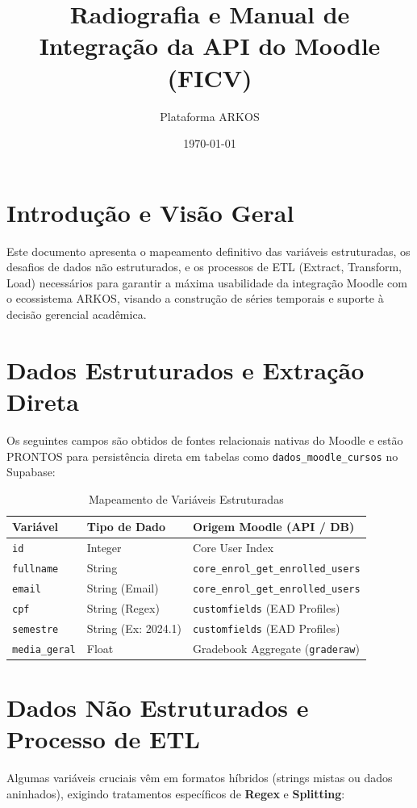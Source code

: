\documentclass{article}
\title{\textbf{Radiografia e Manual de Integração da API do Moodle (FICV)}}
\author{Plataforma ARKOS}
\date{\today}
\begin{document}
\maketitle

\section{Introdução e Visão Geral}
Este documento apresenta o mapeamento definitivo das variáveis estruturadas, os desafios de dados não estruturados, e os processos de ETL (Extract, Transform, Load) necessários para garantir a máxima usabilidade da integração Moodle com o ecossistema ARKOS, visando a construção de séries temporais e suporte à decisão gerencial acadêmica.

\section{Dados Estruturados e Extração Direta}
Os seguintes campos são obtidos de fontes relacionais nativas do Moodle e estão PRONTOS para persistência direta em tabelas como \texttt{dados\_moodle\_cursos} no Supabase:

\vspace{0.3cm}
\begin{table}[htbp]
  \centering
  \caption{Mapeamento de Variáveis Estruturadas}
    \begin{tabular}{lll}
    \toprule
    \textbf{Variável} & \textbf{Tipo de Dado} & \textbf{Origem Moodle (API / DB)} \\
    \midrule
    \texttt{id} & Integer & Core User Index \\
    \texttt{fullname} & String & \texttt{core\_enrol\_get\_enrolled\_users} \\
    \texttt{email} & String (Email) & \texttt{core\_enrol\_get\_enrolled\_users} \\
    \texttt{cpf} & String (Regex) & \texttt{customfields} (EAD Profiles) \\
    \texttt{semestre} & String (Ex: 2024.1) & \texttt{customfields} (EAD Profiles) \\
    \texttt{media\_geral} & Float & Gradebook Aggregate (\texttt{graderaw}) \\
    \bottomrule
    \end{tabular}
\end{table}

\section{Dados Não Estruturados e Processo de ETL}
Algumas variáveis cruciais vêm em formatos híbridos (strings mistas ou dados aninhados), exigindo tratamentos específicos de \textbf{Regex} e \textbf{Splitting}:
\end{document}
